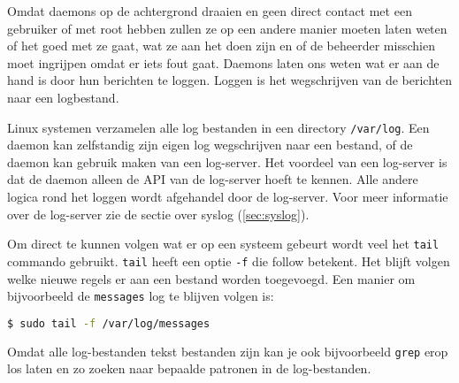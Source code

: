 Omdat daemons op de achtergrond draaien en geen direct contact met een gebruiker of met root hebben zullen ze op een andere manier moeten laten weten of het goed met ze gaat, wat ze aan het doen zijn en of de beheerder misschien moet ingrijpen omdat er iets fout gaat. Daemons laten ons weten wat er aan de hand is door hun berichten te loggen. Loggen is het wegschrijven van de berichten naar een logbestand.

Linux systemen verzamelen alle log bestanden in een directory \texttt{/var/log}. Een daemon kan zelfstandig zijn eigen log wegschrijven naar een bestand, of de daemon kan gebruik maken van een log-server. Het voordeel van een log-server is dat de daemon alleen de API van de log-server hoeft te kennen. Alle andere logica rond het loggen wordt afgehandel door de log-server. Voor meer informatie over de log-server zie de sectie over syslog (\ref{sec:syslog}).

Om direct te kunnen volgen wat er op een systeem gebeurt wordt veel het \texttt{tail} commando gebruikt. \texttt{tail} heeft een optie \texttt{-f} die follow betekent. Het blijft volgen welke nieuwe regels er aan een bestand worden toegevoegd. Een manier om bijvoorbeeld de \texttt{messages} log te blijven volgen is:
\begin{lstlisting}[language=bash]
$ sudo tail -f /var/log/messages
\end{lstlisting}

Omdat alle log-bestanden tekst bestanden zijn kan je ook bijvoorbeeld \texttt{grep} erop los laten en zo zoeken naar bepaalde patronen in de log-bestanden.


